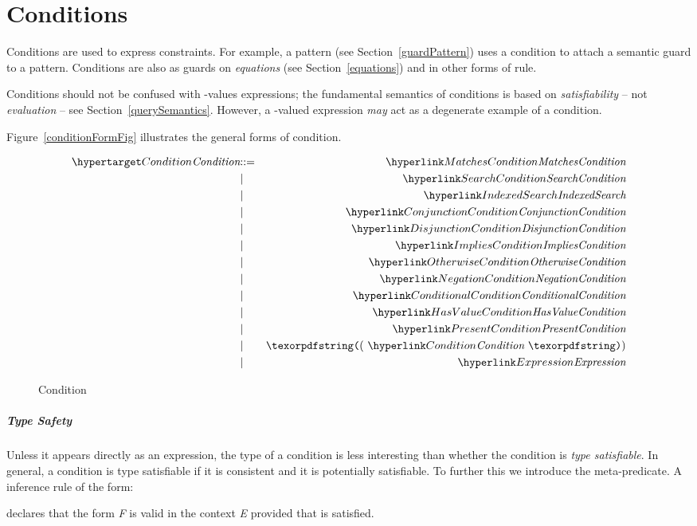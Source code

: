 \chapter{Conditions}
\label{conditions}
Conditions are used to express constraints. For example, a  pattern (see Section~\vref{guardPattern}) uses a condition to attach a semantic guard to a pattern. Conditions are also as guards on \emph{equations} (see Section~\vref{equations}) and in other forms of rule.


\begin{aside}
Conditions should not be confused with -values expressions; the fundamental semantics of conditions is based on \emph{satisfiability} -- not \emph{evaluation} -- see Section~\vref{querySemantics}. However, a -valued expression \emph{may} act as a degenerate example of a condition.
\end{aside}

Figure~\vref{conditionFormFig} illustrates the general forms of condition. 

\begin{figure}[htbp]
\begin{eqnarray*}
\ntDef{Condition}&\arrow&\ntRef{MatchesCondition}\\
&\choice&\ntRef{SearchCondition}\\
&\choice&\ntRef{IndexedSearch}\\
&\choice&\ntRef{ConjunctionCondition}\\
&\choice&\ntRef{DisjunctionCondition}\\
&\choice&\ntRef{ImpliesCondition}\\
&\choice&\ntRef{OtherwiseCondition}\\
&\choice&\ntRef{NegationCondition}\\
&\choice&\ntRef{ConditionalCondition}\\
&\choice&\ntRef{HasValueCondition}\\
&\choice&\ntRef{PresentCondition}\\
&\choice&\q{(}\ \ntRef{Condition}\ \q{)}\\
&\choice&\ntRef{Expression}
\end{eqnarray*}
\caption{Condition}
\label{conditionFormFig}
\end{figure}

\paragraph{Type Safety}
Unless it appears directly as an expression, the type of a condition is less interesting than whether the condition is \emph{type satisfiable}. In general, a condition is type satisfiable if it is consistent and it is potentially satisfiable. To further this we introduce the \satinf{} meta-predicate. A inference rule of the form:
\begin{prooftree}
\end{prooftree}
declares that the form \emph{F} is valid in the context \emph{E} provided that  is satisfied.

